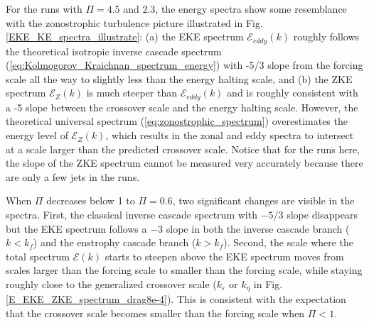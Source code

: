 \documentclass{jfm}
\begin{document}
For the runs with $\Pi=4.5$ and 2.3, the energy spectra show some
resemblance with the zonostrophic turbulence picture illustrated in 
Fig. \ref{EKE_KE_spectra_illustrate}: (a) the EKE spectrum $\mathcal{E}_{eddy}(k)$ 
roughly follows the theoretical isotropic inverse cascade spectrum 
(\ref{eq:Kolmogorov_Kraichnan_spectrum_energy}) with -5/3 slope
from the forcing scale all the way to slightly less than the energy
halting scale, and (b) the ZKE spectrum $\mathcal{E}_{Z}(k)$
is much steeper than $\mathcal{E}_{eddy}(k)$ and is roughly consistent with a -5 slope
between the crossover scale and the energy halting scale. However, the theoretical
universal spectrum (\ref{eq:zonostrophic_spectrum}) overestimates 
the energy level of $\mathcal{E}_{Z}(k)$, which results in the zonal
and eddy spectra to intersect at a scale larger than the predicted
crossover scale. Notice that for the runs here, the slope of the ZKE spectrum
cannot be measured very accurately because there are only a few 
jets in the runs.

When $\Pi$ decreases below 1 to $\Pi=0.6$, two significant changes are 
visible in the spectra. First, the classical inverse cascade spectrum 
with $-5/3$ slope disappears but the EKE spectrum follows a $-3$ slope 
in both the inverse cascade branch ($k<k_{f}$) and the  enstrophy cascade branch ($k>k_{f}$). Second, the scale where the total spectrum $\mathcal{E}(k)$ starts to
steepen above the EKE spectrum moves from scales larger than the forcing scale to
smaller than the forcing scale, while staying roughly close to the generalized
crossover scale ($k_\varepsilon$ or $k_\eta$ in Fig. \ref{E_EKE_ZKE_spectrum_drag8e-4}).
This is consistent with the expectation that the crossover scale 
becomes smaller than the forcing scale when $\Pi<1$. 
\end{document}
